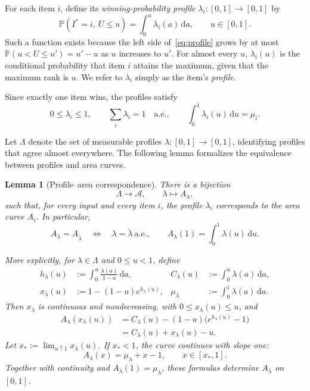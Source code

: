 \documentclass[11pt]{article}
\newtheorem{lemma}[theorem]{Lemma}
\theoremstyle{definition}
\theoremstyle{remark}
\newcommand{\Pp}{\mathbb P}
\newcommand{\dd}{\,\mathrm d}
\begin{document}
For each item $i$, define its \emph{winning-probability profile} $\lambda_i:[0,1]\to[0,1]$ by
\begin{equation}\label{eq:profile}
 \Pp(I^*=i,\ U\le u)
 =\int_0^u\lambda_i(a)\dd a,
 \qquad u\in[0,1].
\end{equation}
Such a function exists because the left side of~\eqref{eq:profile} grows by at most $\Pp(u<U\le u')=u'-u$ as $u$ increases to $u'$.
For almost every $u$, $\lambda_i(u)$ is the conditional probability that item $i$ attains the maximum, given that the maximum rank is $u$.
We refer to $\lambda_i$ simply as the item's \emph{profile}.

Since exactly one item wins, the profiles satisfy
\begin{equation}\label{eq:partition}
 0\le\lambda_i\le1,
 \qquad \sum_i\lambda_i=1\quad\text{a.e.},
 \qquad \int_0^1\lambda_i(u)\dd u=\mu_i.
\end{equation}

Let $\Lambda$ denote the set of measurable profiles $\lambda:[0,1]\to[0,1]$, identifying profiles that agree almost everywhere.
The following lemma formalizes the equivalence between profiles and area curves.

\begin{lemma}[Profile--area correspondence]\label{lem:profile-bijection}
There is a bijection
\[
 \Lambda\longrightarrow\mathcal A,
 \qquad \lambda\longmapsto A_\lambda,
\]
such that, for every input and every item $i$, the profile $\lambda_i$ corresponds to the area curve $A_i$.
In particular,
\[
 A_\lambda=A_{\widetilde\lambda}
 \quad\Longleftrightarrow\quad
 \lambda=\widetilde\lambda\ \text{a.e.},
 \qquad
 A_\lambda(1)=\int_0^1\lambda(u)\dd u.
\]

More explicitly, for $\lambda\in\Lambda$ and $0\le u<1$, define
\begin{equation}\label{eq:profile-coordinates-main}
\begin{aligned}
 h_\lambda(u)&:=\int_0^u\frac{\lambda(a)}{1-a}\dd a,
 & C_\lambda(u)&:=\int_0^u\lambda(a)\dd a,\\
 x_\lambda(u)&:=1-(1-u)e^{h_\lambda(u)},
 & \mu_\lambda&:=\int_0^1\lambda(a)\dd a.
\end{aligned}
\end{equation}
Then $x_\lambda$ is continuous and nondecreasing, with $0\le x_\lambda(u)\le u$, and
\begin{equation}\label{eq:profile-area-main}
\begin{aligned}
 A_\lambda(x_\lambda(u))
 &=C_\lambda(u)-(1-u)\bigl(e^{h_\lambda(u)}-1\bigr)\\
 &=C_\lambda(u)+x_\lambda(u)-u.
\end{aligned}
\end{equation}
Let $x_*:=\lim_{u\uparrow1}x_\lambda(u)$.
If $x_*<1$, the curve continues with slope one:
\begin{equation}\label{eq:profile-extension-main}
 A_\lambda(x)=\mu_\lambda+x-1,
 \qquad x\in[x_*,1].
\end{equation}
Together with continuity and $A_\lambda(1)=\mu_\lambda$, these formulas determine $A_\lambda$ on $[0,1]$.
\end{lemma}
\end{document}
